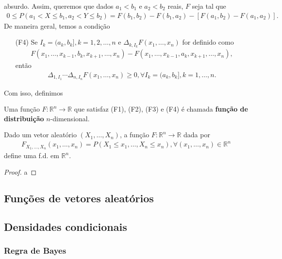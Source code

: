 \documentclass[../Notas.tex]{subfiles}
\begin{document}
absurdo. Assim, queremos que dados $a_1 < b_1$ e $a_2 < b_2$ reais, $F$ seja tal que
\begin{align*}
    0\leq P(a_1 < X\leq b_1, a_2 < Y\leq b_2) = F(b_1, b_2) - F(b_1, a_2) - [F(a_1, b_2) - F(a_1, a_2)].
\end{align*}
De maneira geral, temos a condição
\begin{itemize}
    \item[(F4)] Se $I_k = (a_k, b_k], k = 1,2,\dots,n$ e $\Delta_{k, I_k}F(x_1, \dots, x_n)$ for definido como
    \begin{align*}
        F(x_1, \dots, x_{k-1}, b_k, x_{k+1}, \dots, x_n) - F(x_1, \dots, x_{k-1}, a_k, x_{k+1}, \dots, x_n),
    \end{align*}
    então
    \begin{align*}
        \Delta_{1, I_1}\cdots\Delta_{n,I_n}F(x_1, \dots, x_n) \geq 0, \forall I_k = (a_k,b_k], k = 1,\dots,n.
    \end{align*}
\end{itemize}
Com isso, definimos
\begin{definition}
Uma função $F:\mathbb{R}^n\to\mathbb{R}$ que satisfaz (F1), (F2), (F3) e (F4) é chamada \textbf{função de distribuição} $n$-dimensional.
\end{definition}

\begin{proposition}
Dado um vetor aleatório $(X_1, \dots, X_n)$, a função $F:\mathbb{R}^n\to\mathbb{R}$ dada por
\begin{align*}
    F_{X_1, \dots, X_n}(x_1, \dots, x_n) = P(X_1\leq x_1, \dots, X_n\leq x_n), \forall (x_1, \dots, x_n)\in\mathbb{R}^n
\end{align*}
define uma f.d. em $\mathbb{R}^n$.
\end{proposition}

\begin{proof}
a
\end{proof}


\subsection{Funções de vetores aleatórios}

\subsection{Densidades condicionais}

\subsubsection{Regra de Bayes}
\end{document}
